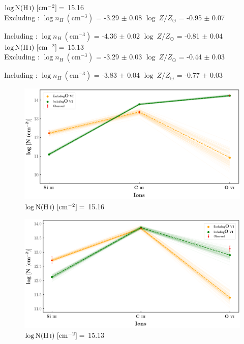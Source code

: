   
  $\log \text{N}(\ion{H}{i}) \ [\text{cm}^{-2}]=$  15.16  \\ 
  
  Excluding  : $\log n_H \ (\text{cm}^{-3})$ = -3.29 $\pm$ 0.08 \hspace{10mm} $\log \ Z/Z_\odot$ = -0.95 $\pm$ 0.07
  
  Including  : $\log n_H \ (\text{cm}^{-3})$ = -4.36 $\pm$ 0.02 \hspace{10mm} $\log \ Z/Z_\odot$ = -0.81 $\pm$ 0.04 \\
  
  $\log \text{N}(\ion{H}{i}) \ [\text{cm}^{-2}]=$  15.13  \\ 
  
  Excluding  : $\log n_H \ (\text{cm}^{-3})$ = -3.29 $\pm$ 0.03 \hspace{10mm} $\log \ Z/Z_\odot$ = -0.44 $\pm$ 0.03
  
  Including  : $\log n_H \ (\text{cm}^{-3})$ = -3.83 $\pm$ 0.04 \hspace{10mm} $\log \ Z/Z_\odot$ = -0.77 $\pm$ 0.03 
  
  \newpage
  
  \begin{figure}[!h]
      \centering
      \includegraphics[width=0.9\linewidth]{Ionisation-Modelling-Plots/h1821-z=0.224981-compII.png}
      \caption{$\log \text{N}(\ion{H}{i}) \ [\text{cm}^{-2}]=$ 15.16}
  \end{figure}
  
  \begin{figure}[!b]
      \centering
      \includegraphics[width=0.9\linewidth]{Ionisation-Modelling-Plots/h1821-z=0.224981-compIV.png}
      \caption{$\log \text{N}(\ion{H}{i}) \ [\text{cm}^{-2}]=$ 15.13}
  \end{figure}
  
